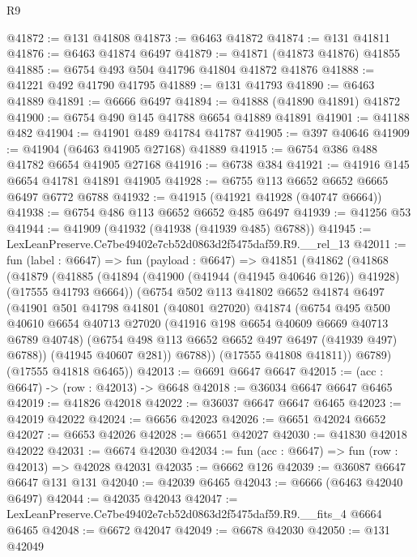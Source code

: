 \begin{lexlean}{R9}
\begin{coremodule}
@41872 := @131 @41808
@41873 := @6463 @41872
@41874 := @131 @41811
@41876 := @6463 @41874 @6497
@41879 := @41871 (@41873 @41876) @41855
@41885 := @6754 @493 @504 @41796 @41804 @41872 @41876
@41888 := @41221 @492 @41790 @41795
@41889 := @131 @41793
@41890 := @6463 @41889
@41891 := @6666 @6497
@41894 := @41888 (@41890 @41891) @41872
@41900 := @6754 @490 @145 @41788 @6654 @41889 @41891
@41901 := @41188 @482
@41904 := @41901 @489 @41784 @41787
@41905 := @397 @40646
@41909 := @41904 (@6463 @41905 @27168) @41889
@41915 := @6754 @386 @488 @41782 @6654 @41905 @27168
@41916 := @6738 @384
@41921 := @41916 @145 @6654 @41781 @41891 @41905
@41928 := @6755 @113 @6652 @6652 @6665 @6497 @6772 @6788
@41932 := @41915 (@41921 @41928 (@40747 @6664))
@41938 := @6754 @486 @113 @6652 @6652 @485 @6497
@41939 := @41256 @53
@41944 := @41909 (@41932 (@41938 (@41939 @485) @6788))
@41945 := LexLeanPreserve.Ce7be49402e7cb52d0863d2f5475daf59.R9.__rel_13
@42011 := fun (label : @6647) =>
  fun (payload : @6647) =>
  @41851
    (@41862
      (@41868
        (@41879
          (@41885
            (@41894 (@41900 (@41944 (@41945 @40646 @126)) @41928) (@17555 @41793 @6664))
            (@6754
              @502
              @113
              @41802
              @6652
              @41874
              @6497
              (@41901
                @501
                @41798
                @41801
                (@40801 @27020)
                @41874
                (@6754
                  @495
                  @500
                  @40610
                  @6654
                  @40713
                  @27020
                  (@41916 @198 @6654 @40609 @6669 @40713 @6789 @40748)
                  (@6754 @498 @113 @6652 @6652 @497 @6497 (@41939 @497) @6788))
                (@41945 @40607 @281))
              @6788))
          (@17555 @41808 @41811))
        @6789)
      (@17555 @41818 @6465))
@42013 := @6691 @6647 @6647
@42015 := (acc : @6647) -> (row : @42013) -> @6648
@42018 := @36034 @6647 @6647 @6465
@42019 := @41826 @42018
@42022 := @36037 @6647 @6647 @6465
@42023 := @42019 @42022
@42024 := @6656 @42023
@42026 := @6651 @42024 @6652
@42027 := @6653 @42026
@42028 := @6651 @42027
@42030 := @41830 @42018 @42022
@42031 := @6674 @42030
@42034 := fun (acc : @6647) => fun (row : @42013) => @42028 @42031
@42035 := @6662 @126
@42039 := @36087 @6647 @6647 @131 @131
@42040 := @42039 @6465
@42043 := @6666 (@6463 @42040 @6497)
@42044 := @42035 @42043
@42047 := LexLeanPreserve.Ce7be49402e7cb52d0863d2f5475daf59.R9.__fits_4 @6664 @6465
@42048 := @6672 @42047
@42049 := @6678 @42030
@42050 := @131 @42049

\end{coremodule}
\end{lexlean}
